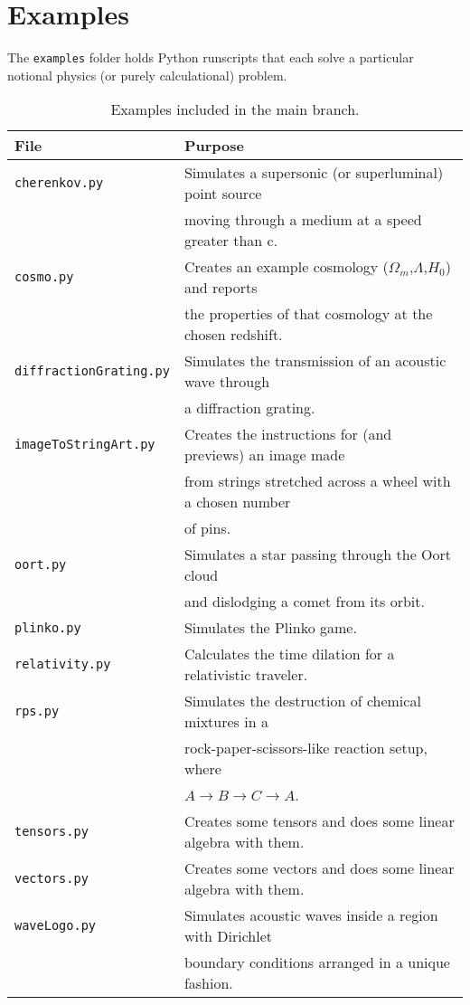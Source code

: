 \documentclass[12pt]{article}
\begin{document}
\newpage
	
	\section{Examples}
	
The \texttt{examples} folder holds Python runscripts that each solve a particular notional physics (or purely calculational) problem. 

\begin{table}[h!]
	\centering
	\caption{Examples included in the main branch.}
	\label{tab:examples}
	\begin{tabular}{|l|l|}
		\hline
		\textbf{File} & \textbf{Purpose}\\
		\hline
		\texttt{cherenkov.py} & Simulates a supersonic (or superluminal) point source \\
		& moving through a medium at a speed greater than c. \\
		\hline		
		\texttt{cosmo.py} & Creates an example cosmology ($\Omega_m$,$\Lambda$,$H_0$) and reports \\
		& the properties of that cosmology at the chosen redshift. \\
		\hline
		\texttt{diffractionGrating.py} & Simulates the transmission of an acoustic wave through \\
		& a diffraction grating.\\
		\hline
		\texttt{imageToStringArt.py} & Creates the instructions for (and previews) an image made \\
		& from strings stretched across a wheel with a chosen number \\
		& of pins. \\
		\hline
		\texttt{oort.py} & Simulates a star passing through the Oort cloud \\
		& and dislodging a comet from its orbit. \\
		\hline
		\texttt{plinko.py} & Simulates the Plinko game. \\
		\hline
		\texttt{relativity.py} & Calculates the time dilation for a relativistic traveler. \\
		\hline
		\texttt{rps.py} & Simulates the destruction of chemical mixtures in a \\
		& rock-paper-scissors-like reaction setup, where \\
		&  $A\to B\to C\to A$.\\
		\hline
		\texttt{tensors.py} & Creates some tensors and does some linear algebra with them.\\
		\hline
		\texttt{vectors.py} & Creates some vectors and does some linear algebra with them.\\
		\hline
		\texttt{waveLogo.py} & Simulates acoustic waves inside a region with Dirichlet\\
		& boundary conditions arranged in a unique fashion.\\
		\hline
	\end{tabular}

\end{table}
\end{document}
